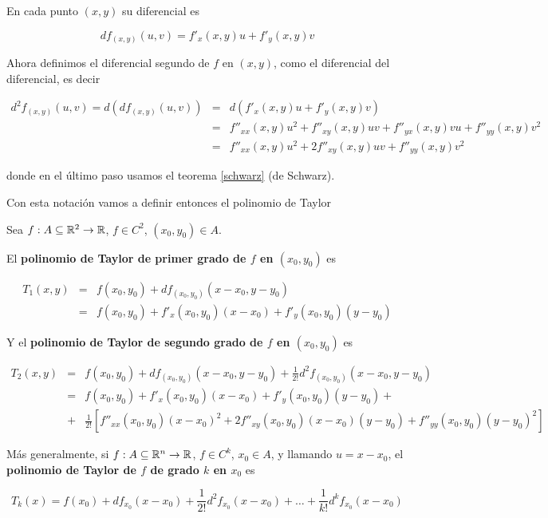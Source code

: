 En cada punto $(x,y)$ su diferencial es

$$ df_{(x,y)}(u,v) = f'_x(x,y)u + f'_y(x,y)v $$

Ahora definimos el diferencial segundo de $f$ en $(x,y)$, como el diferencial del diferencial, es decir

\begin{eqnarray*} d^2 f_{(x,y)}(u,v) = d( df_{(x,y)}(u,v) ) &=& d( f'_x(x,y)u + f'_y(x,y)v ) \\ 
&=& f''_{xx}(x,y)u^2 + f''_{xy}(x,y)uv + f''_{yx}(x,y)vu + f''_{yy}(x,y)v^2 \\
&=& f''_{xx}(x,y)u^2 + 2 f''_{xy}(x,y)uv + f''_{yy}(x,y)v^2 \end{eqnarray*}

donde en el último paso usamos el teorema \ref{schwarz} (de Schwarz).

Con esta notación vamos a definir entonces el polinomio de Taylor

\begin{definition}[Taylor]  
Sea $f: A \subseteq \mathbb{R}^2 \to \mathbb{R}$, $f \in C^2$, $(x_0, y_0) \in A$.

El \textbf{polinomio de Taylor de primer grado de $f$ en $(x_0, y_0)$} es

\begin{eqnarray*} T_1(x,y) &=& f(x_0,y_0) + df_{(x_0, y_0)}(x-x_0,y-y_0) \\ 
&=& f(x_0,y_0) + f'_x(x_0,y_0)(x-x_0) + f'_y(x_0,y_0)(y-y_0) \end{eqnarray*}

Y el \textbf{polinomio de Taylor de segundo grado de $f$ en $(x_0, y_0)$} es

\begin{eqnarray*} T_2(x,y) &=& f(x_0,y_0) + df_{(x_0,y_0)}(x-x_0,y-y_0) + \frac{1}{2!} d^2f_{(x_0,y_0)}(x-x_0,y-y_0) \\ 
&=& f(x_0,y_0) + f'_x(x_0,y_0)(x-x_0) + f'_y(x_0,y_0)(y-y_0) + \\
&+& \frac{1}{2!} \left[ f''_{xx}(x_0,y_0)(x-x_0)^2 + 2 f''_{xy}(x_0,y_0)(x-x_0)(y-y_0) + f''_{yy}(x_0,y_0)(y-y_0)^2 \right] \end{eqnarray*}

Más generalmente, si $f : A \subseteq \mathbb{R}^n \to \mathbb{R}$, $f \in C^k$, $x_0 \in A$, y llamando $u = x - x_0$, el \textbf{polinomio de Taylor de $f$ de grado $k$ en $x_0$} es

$$ T_k(x) = f(x_0) + df_{x_0}(x-x_0) + \frac{1}{2!} d^2f_{x_0}(x-x_0) + \ldots + \frac{1}{k!}d^kf_{x_0}(x-x_0) $$
\end{definition}

